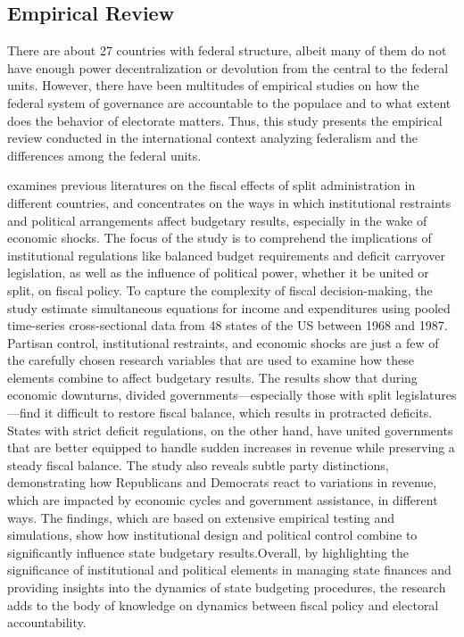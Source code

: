 \subsection{Empirical Review} \vspace{-3mm}
There are about 27 countries with federal structure, albeit many of them do not have enough power decentralization or devolution from the central to the federal units. However, there have been multitudes of empirical studies on how the federal system of governance are accountable to the populace and to what extent does the behavior of electorate matters. Thus, this study presents the empirical review conducted in the international context analyzing federalism and the differences among the federal units. \par
{} examines previous literatures on the fiscal effects of split administration in different countries, and concentrates on the ways in which institutional restraints and political arrangements affect budgetary results, especially in the wake of economic shocks. The focus of the study is to comprehend the implications of institutional regulations like balanced budget requirements and deficit carryover legislation, as well as the influence of political power, whether it be united or split, on fiscal policy. To capture the complexity of fiscal decision-making, the study estimate simultaneous equations for income and expenditures using pooled time-series cross-sectional data from 48 states of the US between 1968 and 1987. Partisan control, institutional restraints, and economic shocks are just a few of the carefully chosen research variables that are used to examine how these elements combine to affect budgetary results. The results show that during economic downturns, divided governments—especially those with split legislatures—find it difficult to restore fiscal balance, which results in protracted deficits. States with strict deficit regulations, on the other hand, have united governments that are better equipped to handle sudden increases in revenue while preserving a steady fiscal balance. The study also reveals subtle party distinctions, demonstrating how Republicans and Democrats react to variations in revenue, which are impacted by economic cycles and government assistance, in different ways. The findings, which are based on extensive empirical testing and simulations, show how institutional design and political control combine to significantly influence state budgetary results.Overall, by highlighting the significance of institutional and political elements in managing state finances and providing insights into the dynamics of state budgeting procedures, the research adds to the body of knowledge on dynamics between fiscal policy and electoral accountability.\par
